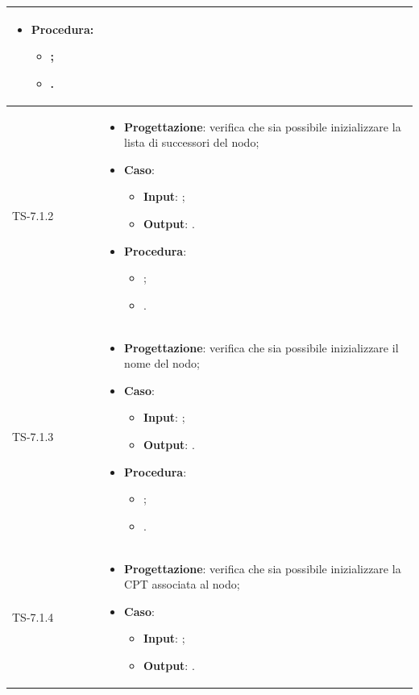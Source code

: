 \begin{longtable}{|C{2.5cm}|C{13cm}|}
\begin{itemize}
	\item \textbf{Procedura}:
	\begin{itemize}
		\item ;
		\item .
	\end{itemize} 
\end{itemize}
	  \\
	\hline
	{TS-7.1.2} & 
\begin{itemize}
	\item \textbf{Progettazione}: verifica che sia possibile inizializzare la lista di successori del nodo;
	\item \textbf{Caso}: 
	\begin{itemize}
		\item \textbf{Input}: ;
		\item \textbf{Output}: .
	\end{itemize}
	\item \textbf{Procedura}:
	\begin{itemize}
		\item ;
		\item .
	\end{itemize} 
\end{itemize}
	  \\
	\hline
	{TS-7.1.3} &
\begin{itemize}
	\item \textbf{Progettazione}: verifica che sia possibile inizializzare il nome del nodo;
	\item \textbf{Caso}: 
	\begin{itemize}
		\item \textbf{Input}: ;
		\item \textbf{Output}: .
	\end{itemize}
	\item \textbf{Procedura}:
	\begin{itemize}
		\item ;
		\item .
	\end{itemize} 
\end{itemize}
	  \\
	\hline
	{TS-7.1.4} &
\begin{itemize}
	\item \textbf{Progettazione}: verifica che sia possibile inizializzare la CPT associata al nodo;
	\item \textbf{Caso}: 
	\begin{itemize}
		\item \textbf{Input}: ;
		\item \textbf{Output}: .

\end{itemize}
\end{itemize}
\end{longtable}
